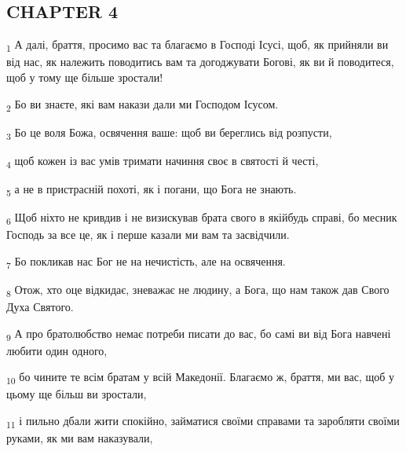 \subsection{CHAPTER 4}
\begin{tcolorbox}
\textsubscript{1} А далі, браття, просимо вас та благаємо в Господі Ісусі, щоб, як прийняли ви від нас, як належить поводитись вам та догоджувати Богові, як ви й поводитеся, щоб у тому ще більше зростали!
\end{tcolorbox}
\begin{tcolorbox}
\textsubscript{2} Бо ви знаєте, які вам накази дали ми Господом Ісусом.
\end{tcolorbox}
\begin{tcolorbox}
\textsubscript{3} Бо це воля Божа, освячення ваше: щоб ви береглись від розпусти,
\end{tcolorbox}
\begin{tcolorbox}
\textsubscript{4} щоб кожен із вас умів тримати начиння своє в святості й честі,
\end{tcolorbox}
\begin{tcolorbox}
\textsubscript{5} а не в пристрасній похоті, як і погани, що Бога не знають.
\end{tcolorbox}
\begin{tcolorbox}
\textsubscript{6} Щоб ніхто не кривдив і не визискував брата свого в якійбудь справі, бо месник Господь за все це, як і перше казали ми вам та засвідчили.
\end{tcolorbox}
\begin{tcolorbox}
\textsubscript{7} Бо покликав нас Бог не на нечистість, але на освячення.
\end{tcolorbox}
\begin{tcolorbox}
\textsubscript{8} Отож, хто оце відкидає, зневажає не людину, а Бога, що нам також дав Свого Духа Святого.
\end{tcolorbox}
\begin{tcolorbox}
\textsubscript{9} А про братолюбство немає потреби писати до вас, бо самі ви від Бога навчені любити один одного,
\end{tcolorbox}
\begin{tcolorbox}
\textsubscript{10} бо чините те всім братам у всій Македонії. Благаємо ж, браття, ми вас, щоб у цьому ще більш ви зростали,
\end{tcolorbox}
\begin{tcolorbox}
\textsubscript{11} і пильно дбали жити спокійно, займатися своїми справами та заробляти своїми руками, як ми вам наказували,
\end{tcolorbox}
